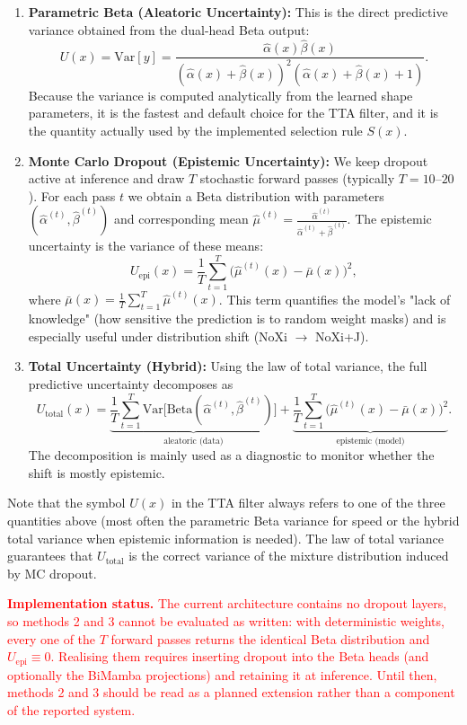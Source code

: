 \documentclass[11pt,a4paper]{article}
\begin{document}
	\begin{enumerate}
		\item \textbf{Parametric Beta (Aleatoric Uncertainty):}  
		This is the direct predictive variance obtained from the dual-head Beta output:
		$$
		U(x) = \mathrm{Var}[y] = \frac{\hat{\alpha}(x)\hat{\beta}(x)}{(\hat{\alpha}(x)+\hat{\beta}(x))^2(\hat{\alpha}(x)+\hat{\beta}(x)+1)}.
		$$
		Because the variance is computed analytically from the learned shape parameters, it is the fastest and default choice for the TTA filter, and it is the quantity actually used by the implemented selection rule $S(x)$.
		
		\item \textbf{Monte Carlo Dropout (Epistemic Uncertainty):}  
		We keep dropout active at inference and draw $T$ stochastic forward passes (typically $T=10$--$20$). For each pass $t$ we obtain a Beta distribution with parameters $(\hat{\alpha}^{(t)},\hat{\beta}^{(t)})$ and corresponding mean $\displaystyle \hat{\mu}^{(t)} = \frac{\hat{\alpha}^{(t)}}{\hat{\alpha}^{(t)}+\hat{\beta}^{(t)}}$.  
		The epistemic uncertainty is the variance of these means:
		$$
		U_{\text{epi}}(x) = \frac{1}{T}\sum_{t=1}^T \bigl(\hat{\mu}^{(t)}(x) - \bar{\mu}(x)\bigr)^2,
		$$
		where $\bar{\mu}(x) = \frac{1}{T}\sum_{t=1}^T \hat{\mu}^{(t)}(x)$. This term quantifies the model's "lack of knowledge" (how sensitive the prediction is to random weight masks) and is especially useful under distribution shift (NoXi $\to$ NoXi+J).
		
		\item \textbf{Total Uncertainty (Hybrid):}  
		Using the law of total variance, the full predictive uncertainty decomposes as
		$$
		U_{\text{total}}(x) = \underbrace{\frac{1}{T}\sum_{t=1}^T \mathrm{Var}\bigl[\mathrm{Beta}(\hat{\alpha}^{(t)},\hat{\beta}^{(t)})\bigr]}_{\text{aleatoric (data)}} 
		+ \underbrace{\frac{1}{T}\sum_{t=1}^T \bigl(\hat{\mu}^{(t)}(x) - \bar{\mu}(x)\bigr)^2}_{\text{epistemic (model)}}.
		$$
		The decomposition is mainly used as a diagnostic to monitor whether the shift is mostly epistemic.
	\end{enumerate}
	
	Note that the symbol $U(x)$ in the TTA filter always refers to one of the three quantities above (most often the parametric Beta variance for speed or the hybrid total variance when epistemic information is needed). The law of total variance guarantees that $U_{\text{total}}$ is the correct variance of the mixture distribution induced by MC dropout.
	
	\textcolor{red}{\textbf{Implementation status.} The current architecture contains no dropout layers, so methods 2 and 3 cannot be evaluated as written: with deterministic weights, every one of the $T$ forward passes returns the identical Beta distribution and $U_{\text{epi}} \equiv 0$. Realising them requires inserting dropout into the Beta heads (and optionally the BiMamba projections) and retaining it at inference. Until then, methods 2 and 3 should be read as a planned extension rather than a component of the reported system.}
	
\end{document}
